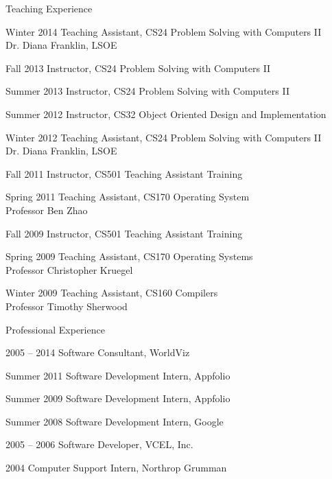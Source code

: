 \begin{vitae}
{\begin{vitaesection}{Teaching Experience}
\vspace{-0.1cm}
  \item [Winter 2014] Teaching Assistant, CS24 Problem Solving with Computers
    II\\ Dr. Diana Franklin, LSOE
  \item [Fall 2013] Instructor, CS24 Problem Solving with Computers II
  \item [Summer 2013] Instructor, CS24 Problem Solving with Computers II
  \item [Summer 2012] Instructor, CS32 Object Oriented Design and
    Implementation
  \item [Winter 2012] Teaching Assistant, CS24 Problem Solving with Computers
    II\\ Dr. Diana Franklin, LSOE
  \item [Fall 2011] Instructor, CS501 Teaching Assistant Training
  \item [Spring 2011] Teaching Assistant, CS170 Operating System\\ Professor
    Ben Zhao
  \item [Fall 2009] Instructor, CS501 Teaching Assistant Training
  \item [Spring 2009] Teaching Assistant, CS170 Operating Systems\\ Professor
    Christopher Kruegel
  \item [Winter 2009] Teaching Assistant, CS160 Compilers\\ Professor Timothy
    Sherwood
\end{vitaesection}

\begin{vitaesection}{Professional Experience}
\vspace{-0.1cm}
  \item [2005 -- 2014] Software Consultant, WorldViz
  \item [Summer 2011] Software Development Intern, Appfolio
  \item [Summer 2009] Software Development Intern, Appfolio
  \item [Summer 2008] Software Development Intern, Google
  \item [2005 -- 2006] Software Developer, VCEL, Inc.
  \item [2004] Computer Support Intern, Northrop Grumman
\end{vitaesection}

}
\end{vitae}
